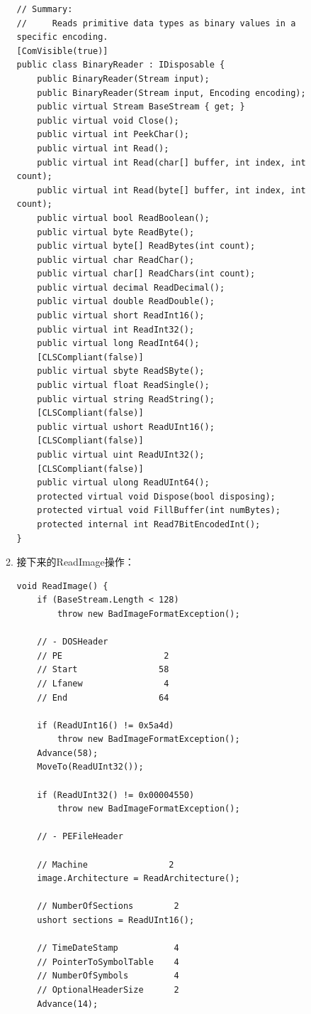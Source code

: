 \documentclass[9pt, b5paper]{article}
\begin{document}
\begin{enumerate}
\begin{enumerate}
\begin{verbatim}
// Summary:
//     Reads primitive data types as binary values in a specific encoding.
[ComVisible(true)]
public class BinaryReader : IDisposable {
    public BinaryReader(Stream input);
    public BinaryReader(Stream input, Encoding encoding);
    public virtual Stream BaseStream { get; }
    public virtual void Close();
    public virtual int PeekChar();
    public virtual int Read();
    public virtual int Read(char[] buffer, int index, int count);
    public virtual int Read(byte[] buffer, int index, int count);
    public virtual bool ReadBoolean();
    public virtual byte ReadByte();
    public virtual byte[] ReadBytes(int count);
    public virtual char ReadChar();
    public virtual char[] ReadChars(int count);
    public virtual decimal ReadDecimal();
    public virtual double ReadDouble();
    public virtual short ReadInt16();
    public virtual int ReadInt32();
    public virtual long ReadInt64();
    [CLSCompliant(false)]
    public virtual sbyte ReadSByte();
    public virtual float ReadSingle();
    public virtual string ReadString();
    [CLSCompliant(false)]
    public virtual ushort ReadUInt16();
    [CLSCompliant(false)]
    public virtual uint ReadUInt32();
    [CLSCompliant(false)]
    public virtual ulong ReadUInt64();
    protected virtual void Dispose(bool disposing);
    protected virtual void FillBuffer(int numBytes);
    protected internal int Read7BitEncodedInt();
}
\end{verbatim}
\item 接下来的ReadImage操作：
\label{sec-10-1-3-1-2}
\begin{verbatim}
void ReadImage() {
    if (BaseStream.Length < 128)
        throw new BadImageFormatException();

    // - DOSHeader
    // PE                    2
    // Start                58
    // Lfanew                4
    // End                  64

    if (ReadUInt16() != 0x5a4d)
        throw new BadImageFormatException();
    Advance(58);
    MoveTo(ReadUInt32());

    if (ReadUInt32() != 0x00004550)
        throw new BadImageFormatException();

    // - PEFileHeader

    // Machine                2
    image.Architecture = ReadArchitecture();

    // NumberOfSections        2
    ushort sections = ReadUInt16();

    // TimeDateStamp           4
    // PointerToSymbolTable    4
    // NumberOfSymbols         4
    // OptionalHeaderSize      2
    Advance(14);


\end{verbatim}
\end{enumerate}
\end{enumerate}
\end{document}
